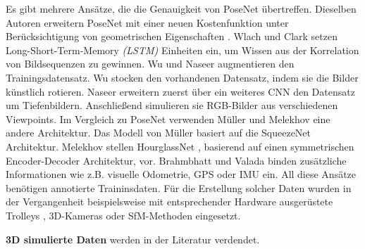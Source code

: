 Es gibt mehrere Ansätze, die die Genauigkeit von PoseNet übertreffen.
Dieselben Autoren erweitern PoseNet mit einer neuen Kostenfunktion unter Berücksichtigung von geometrischen Eigenschaften \cite{kendallGeometricLossFunctions2017}. Wlach \etal\cite{walchImagebasedLocalizationUsing2016} und Clark \etal\cite{clarkVidLocDeepSpatioTemporal2017} setzen Long-Short-Term-Memory \textit{(LSTM)} \cite{hochreiterLongShortTermMemory1997a} Einheiten ein, um Wissen aus der Korrelation von Bildsequenzen zu gewinnen. Wu \etal\cite{wuDelvingDeeperConvolutional2017} und Naseer \etal\cite{naseerDeepRegressionMonocular2017} augmentieren den Trainingsdatensatz. Wu \etal\cite{wuDelvingDeeperConvolutional2017} stocken den vorhandenen Datensatz, indem sie die Bilder künstlich rotieren. Naseer \etal\cite{naseerDeepRegressionMonocular2017} erweitern zuerst über ein weiteres CNN den Datensatz um Tiefenbildern. Anschließend simulieren sie RGB-Bilder aus verschiedenen Viewpoints. Im Vergleich zu PoseNet verwenden Müller \etal \cite{mullerSQUEEZEPOSENETIMAGEBASED2017} und Melekhov \etal\cite{melekhovImageBasedLocalizationUsing2017} eine andere Architektur. 
Das Modell von Müller \etal \cite{mullerSQUEEZEPOSENETIMAGEBASED2017} basiert auf die SqueezeNet\cite{iandolaSqueezeNetAlexNetlevelAccuracy2016} Architektur. Melekhov \etal stellen HourglassNet \cite{melekhovImageBasedLocalizationUsing2017}, basierend auf einen symmetrischen Encoder-Decoder Architektur, vor. Brahmbhatt \etal\cite{brahmbhattGeometryAwareLearningMaps2018} und Valada \etal\cite{valadaDeepAuxiliaryLearning2018, valadaIncorporatingSemanticGeometric} binden zusätzliche Informationen wie z.B. visuelle Odometrie, GPS oder IMU ein. 
All diese Ansätze benötigen annotierte Traininsdaten. Für die Erstellung solcher Daten wurden in der Vergangenheit beispielsweise mit entsprechender Hardware ausgerüstete Trolleys \cite{huitlTUMindoorExtensiveImage2012}, 3D-Kameras \cite{izadiKinectFusionRealtime3D2011} oder SfM-Methoden \cite{kendallPoseNetConvolutionalNetwork2015} eingesetzt.

\textbf{3D simulierte Daten} werden in der Literatur verdendet.


% 
